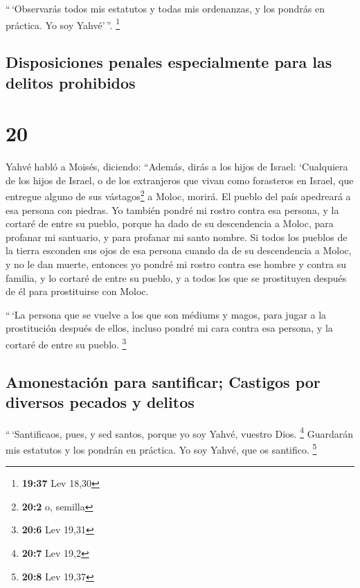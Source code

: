  ``\,`Observarás todos mis estatutos y todas mis
ordenanzas, y los pondrás en práctica. Yo soy Yahvé'\,''. \footnote{\textbf{19:37}
  Lev 18,30}

\hypertarget{disposiciones-penales-especialmente-para-las-delitos-prohibidos}{%
\subsection{Disposiciones penales especialmente para las delitos
prohibidos}\label{disposiciones-penales-especialmente-para-las-delitos-prohibidos}}

\hypertarget{section-19}{%
\section{20}\label{section-19}}

 Yahvé habló a Moisés, diciendo:  ``Además,
dirás a los hijos de Israel: `Cualquiera de los hijos de Israel, o de
los extranjeros que vivan como forasteros en Israel, que entregue alguno
de sus vástagos\footnote{\textbf{20:2} o, semilla} a Moloc, morirá. El
pueblo del país apedreará a esa persona con piedras.  Yo
también pondré mi rostro contra esa persona, y la cortaré de entre su
pueblo, porque ha dado de su descendencia a Moloc, para profanar mi
santuario, y para profanar mi santo nombre.  Si todos los
pueblos de la tierra esconden sus ojos de esa persona cuando da de su
descendencia a Moloc, y no le dan muerte,  entonces yo
pondré mi rostro contra ese hombre y contra su familia, y lo cortaré de
entre su pueblo, y a todos los que se prostituyen después de él para
prostituirse con Moloc.

 ``\,`La persona que se vuelve a los que son médiums y
magos, para jugar a la prostitución después de ellos, incluso pondré mi
cara contra esa persona, y la cortaré de entre su pueblo. \footnote{\textbf{20:6}
  Lev 19,31}

\hypertarget{amonestaciuxf3n-para-santificar-castigos-por-diversos-pecados-y-delitos}{%
\subsection{Amonestación para santificar; Castigos por diversos pecados
y
delitos}\label{amonestaciuxf3n-para-santificar-castigos-por-diversos-pecados-y-delitos}}

 ``\,`Santificaos, pues, y sed santos, porque yo soy
Yahvé, vuestro Dios. \footnote{\textbf{20:7} Lev 19,2} 
Guardarán mis estatutos y los pondrán en práctica. Yo soy Yahvé, que os
santifico. \footnote{\textbf{20:8} Lev 19,37}

